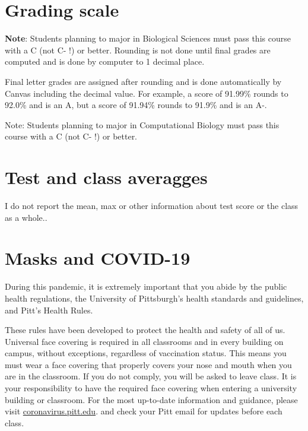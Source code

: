 \documentclass[
]{book}
\begin{document}
\hypertarget{grading-scale}{%
\chapter{Grading scale}\label{grading-scale}}

\textbf{Note}: Students planning to major in Biological Sciences must pass this course with a C (not C- !) or better. Rounding is not done until final grades are computed and is done by computer to 1 decimal place.

Final letter grades are assigned after rounding and is done automatically by Canvas including the decimal value. For example, a score of 91.99\% rounds to 92.0\% and is an A, but a score of 91.94\% rounds to 91.9\% and is an A-.

Note: Students planning to major in Computational Biology must pass this course with a C (not C- !) or better.

\hypertarget{test-and-class-averagges}{%
\chapter{Test and class averagges}\label{test-and-class-averagges}}

I do not report the mean, max or other information about test score or the class as a whole..

\hypertarget{masks-and-covid-19}{%
\chapter{Masks and COVID-19}\label{masks-and-covid-19}}

During this pandemic, it is extremely important that you abide by the public health regulations, the University of Pittsburgh's health standards and guidelines, and Pitt's Health Rules.

These rules have been developed to protect the health and safety of all of us. Universal face covering is required in all classrooms and in every building on campus, without exceptions, regardless of vaccination status. This means you must wear a face covering that properly covers your nose and mouth when you are in the classroom. If you do not comply, you will be asked to leave class. It is your responsibility to have the required face covering when entering a university building or classroom. For the most up-to-date information and guidance, please visit \url{coronavirus.pitt.edu}. and check your Pitt email for updates before each class.
\end{document}
